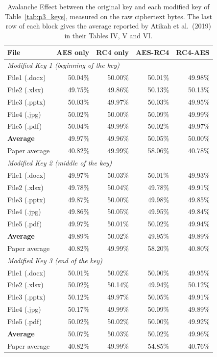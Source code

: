 \begin{table}[htbp]
\centering
\caption{Avalanche Effect between the original key and each modified key of Table~\ref{tab:p3_keys}, measured on the raw ciphertext bytes. The last row of each block gives the average reported by Atikah et al.\ (2019) in their Tables IV, V and VI.}
\label{tab:p3_ae_paper}
\small
\begin{tabular}{lrrrr}
\toprule
\textbf{File} & \textbf{AES only} & \textbf{RC4 only} & \textbf{AES-RC4} & \textbf{RC4-AES} \\
\midrule
\multicolumn{5}{l}{\textit{Modified Key 1 (beginning of the key)}} \\
File1 (.docx) & 50.04\% & 50.00\% & 50.01\% & 49.98\% \\
File2 (.xlsx) & 49.75\% & 49.86\% & 50.13\% & 50.13\% \\
File3 (.pptx) & 50.03\% & 49.97\% & 50.03\% & 49.95\% \\
File4 (.jpg) & 50.02\% & 50.00\% & 50.09\% & 49.99\% \\
File5 (.pdf) & 50.04\% & 49.99\% & 50.02\% & 49.97\% \\
\textbf{Average} & 49.97\% & 49.96\% & 50.05\% & 50.00\% \\
Paper average & 40.82\% & 49.99\% & 58.06\% & 40.78\% \\
\midrule
\multicolumn{5}{l}{\textit{Modified Key 2 (middle of the key)}} \\
File1 (.docx) & 49.97\% & 50.03\% & 50.01\% & 49.93\% \\
File2 (.xlsx) & 49.78\% & 50.04\% & 49.78\% & 49.91\% \\
File3 (.pptx) & 49.87\% & 50.00\% & 49.98\% & 49.85\% \\
File4 (.jpg) & 49.86\% & 50.05\% & 49.95\% & 49.84\% \\
File5 (.pdf) & 49.97\% & 50.01\% & 50.02\% & 49.94\% \\
\textbf{Average} & 49.89\% & 50.02\% & 49.95\% & 49.89\% \\
Paper average & 40.82\% & 49.99\% & 58.20\% & 40.80\% \\
\midrule
\multicolumn{5}{l}{\textit{Modified Key 3 (end of the key)}} \\
File1 (.docx) & 50.01\% & 50.02\% & 50.00\% & 49.95\% \\
File2 (.xlsx) & 50.02\% & 50.14\% & 49.94\% & 50.12\% \\
File3 (.pptx) & 50.12\% & 49.97\% & 50.05\% & 49.91\% \\
File4 (.jpg) & 50.17\% & 49.99\% & 50.09\% & 49.89\% \\
File5 (.pdf) & 50.02\% & 50.02\% & 50.00\% & 49.92\% \\
\textbf{Average} & 50.07\% & 50.03\% & 50.02\% & 49.96\% \\
Paper average & 40.82\% & 49.99\% & 54.85\% & 40.76\% \\
\bottomrule
\end{tabular}
\end{table}
